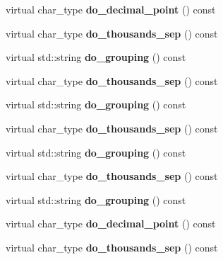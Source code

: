 \begin{DoxyCompactItemize}
virtual char\+\_\+type {\bfseries do\+\_\+decimal\+\_\+point} () const
\item 
\mbox{\label{classmy__numpunct_ae8e4a2f264795c77596cf270d7447d92}} 
virtual char\+\_\+type {\bfseries do\+\_\+thousands\+\_\+sep} () const
\item 
\mbox{\label{classmy__numpunct_ae6a03737ec958404f7f11693d772d1ee}} 
virtual std\+::string {\bfseries do\+\_\+grouping} () const
\item 
\mbox{\label{classmy__numpunct_ae8e4a2f264795c77596cf270d7447d92}} 
virtual char\+\_\+type {\bfseries do\+\_\+thousands\+\_\+sep} () const
\item 
\mbox{\label{classmy__numpunct_ae6a03737ec958404f7f11693d772d1ee}} 
virtual std\+::string {\bfseries do\+\_\+grouping} () const
\item 
\mbox{\label{classmy__numpunct_ae8e4a2f264795c77596cf270d7447d92}} 
virtual char\+\_\+type {\bfseries do\+\_\+thousands\+\_\+sep} () const
\item 
\mbox{\label{classmy__numpunct_ae6a03737ec958404f7f11693d772d1ee}} 
virtual std\+::string {\bfseries do\+\_\+grouping} () const
\item 
\mbox{\label{classmy__numpunct_ae8e4a2f264795c77596cf270d7447d92}} 
virtual char\+\_\+type {\bfseries do\+\_\+thousands\+\_\+sep} () const
\item 
\mbox{\label{classmy__numpunct_ae6a03737ec958404f7f11693d772d1ee}} 
virtual std\+::string {\bfseries do\+\_\+grouping} () const
\item 
\mbox{\label{classmy__numpunct_a9de76f2f6beafce029f52414ecce7c5d}} 
virtual char\+\_\+type {\bfseries do\+\_\+decimal\+\_\+point} () const
\item 
\mbox{\label{classmy__numpunct_ae8e4a2f264795c77596cf270d7447d92}} 
virtual char\+\_\+type {\bfseries do\+\_\+thousands\+\_\+sep} () const
\item 
\mbox{\label{classmy__numpunct_ae6a03737ec958404f7f11693d772d1ee}} 

\end{DoxyCompactItemize}
